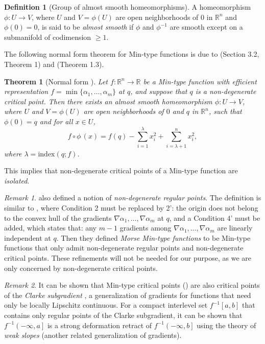 \documentclass[11pt]{article}
\newcommand{\R}{\mathbb{R}}
\newcommand{\idx}{\mathrm{index}}
\newcommand{\grad}{\nabla}
\newcommand{\sublevel}[2]{{#1}^{-1}\left(-\infty, {#2}\right]}
\newcommand{\intlevel}[3]{{#1}^{-1}\left[{#2}, {#3}\right]}
\theoremstyle{plain}
\newtheorem{thm}{Theorem}
\theoremstyle{definition}
\newtheorem{defi}{Definition}
\theoremstyle{remark}
\newtheorem{rmk}{Remark}
\begin{document}
	\begin{defi}[Group of almost smooth homeomorphisms]
		A homeomorphism $\phi : U \to V$, where $U$ and $V = \phi(U)$ are open neighborhoods of $0$ in $\R^n$ and $\phi(0) = 0$, is said to be \textit{almost smooth} if $\phi$ and $\phi^{-1}$ are smooth except on a submanifold of codimension $\geq 1$.
	\end{defi}
	
	The following normal form theorem for Min-type functions is due to \cite{gershkovich_morse_1997} (Section 3.2, Theorem 1) and \cite{gershkovich_singularity_1997} (Theorem 1.3). 
	\begin{thm}[Normal form \citep{gershkovich_morse_1997}]
		\label{thm:normal_form}
		Let $f : \R^n \to \R$ be a Min-type function with efficient representation $f = \min \{ \alpha_1, \ldots, \alpha_m\}$ at $q$, and suppose that $q$ is a non-degenerate critical point. Then there exists an almost smooth homeomorphism $\phi : U \to V$, where $U$ and $V = \phi(U)$ are open neighborhoods of $0$ and $q$ in $\R^n$, such that $\phi(0) = q$ and for all $x \in U$, 
		\[ f \circ \phi \,(x) = f(q) - \sum_{i = 1}^{\lambda} x_i^2 + \sum_{i = \lambda + 1}^{n} x_i^2,\]
		where $\lambda = \idx(q; f)$. 
	\end{thm}
	This implies that non-degenerate critical points of a Min-type function are \emph{isolated}.
	
	\begin{rmk}
		\cite{gershkovich_morse_1997} also defined a notion of \emph{non-degenerate regular points}. The definition is similar to , where Condition 2 must be replaced by 2': the origin does not belong to the convex hull of the gradients $\grad \alpha_1, \ldots, \grad \alpha_m$ at $q$, and a Condition 4' must be added, which states that: any $m-1$ gradients among $\grad \alpha_1, \ldots, \grad \alpha_m$ are linearly independent at $q$.
		Then they defined \emph{Morse Min-type functions} to be Min-type functions that only admit non-degenerate regular points and non-degenerate critical points. These refinements will not be needed for our purpose, as we are only concerned by non-degenerate critical points. 
	\end{rmk}
	
	\begin{rmk} \label{rmk:clarke1}
		It can be shown that Min-type critical points () are also critical points of the \emph{Clarke subgradient} \citep{clarke1990optimization,agrachev1997morse}, a generalization of gradients for functions that need only be locally Lipschitz continuous. For a compact interlevel set $\intlevel{f}{a}{b}$ that contains only regular points of the Clarke subgradient, it can be shown that $\sublevel{f}{a}$ is a strong deformation retract of $\sublevel{f}{b}$ using the theory of \emph{weak slopes} \citep{corvellec2001Second} (another related generalization of gradients).
	\end{rmk}
	
\end{document}

